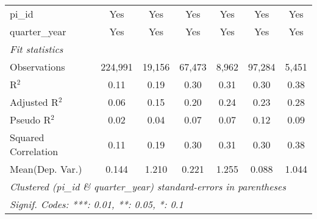 \begin{tabular}{lcccccc}
   pi\_id                                                     & Yes           & Yes            & Yes           & Yes           & Yes           & Yes\\  
   quarter\_year                                              & Yes           & Yes            & Yes           & Yes           & Yes           & Yes\\  
   \midrule
   \emph{Fit statistics}\\
   Observations                                               & 224,991       & 19,156         & 67,473        & 8,962         & 97,284        & 5,451\\  
   R$^2$                                                      & 0.11          & 0.19           & 0.30          & 0.31          & 0.30          & 0.38\\  
   Adjusted R$^2$                                             & 0.06          & 0.15           & 0.20          & 0.24          & 0.23          & 0.28\\  
   Pseudo R$^2$                                               & 0.02          & 0.04           & 0.07          & 0.07          & 0.12          & 0.09\\  
   Squared Correlation                                        & 0.11          & 0.19           & 0.30          & 0.31          & 0.30          & 0.38\\  
Mean(Dep. Var.) & 0.144 & 1.210 & 0.221 & 1.255 & 0.088 & 1.044 \\
   \midrule \midrule
   \multicolumn{7}{l}{\emph{Clustered (pi\_id \& quarter\_year) standard-errors in parentheses}}\\
   \multicolumn{7}{l}{\emph{Signif. Codes: ***: 0.01, **: 0.05, *: 0.1}}\\
\end{tabular}
\par\endgroup

